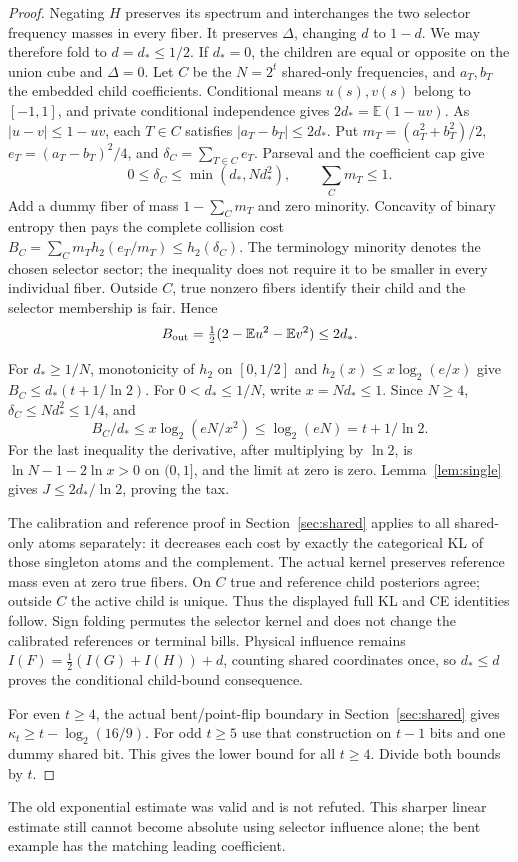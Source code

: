 \documentclass[11pt]{article}
\newcommand{\E}{\mathbb E}
\begin{document}
\begin{proof}
Negating $H$ preserves its spectrum and interchanges the two selector
frequency masses in every fiber. It preserves $\Delta$, changing $d$ to
$1-d$. We may therefore fold to $d=d_*\le1/2$. If $d_*=0$, the children
are equal or opposite on the union cube and $\Delta=0$.
Let $C$ be the $N=2^t$ shared-only frequencies, and $a_T,b_T$ the
embedded child coefficients. Conditional means $u(s),v(s)$ belong to
$[-1,1]$, and private conditional independence gives $2d_*=\E(1-uv)$.
As $|u-v|\le1-uv$, each $T\in C$ satisfies $|a_T-b_T|\le2d_*$.
Put $m_T=(a_T^2+b_T^2)/2$, $e_T=(a_T-b_T)^2/4$, and
$\delta_C=\sum_{T\in C}e_T$. Parseval and the coefficient cap give
\[
 0\le\delta_C\le\min(d_*,N d_*^2),\qquad\sum_C m_T\le1.
\]
Add a dummy fiber of mass $1-\sum_C m_T$ and zero minority. Concavity
of binary entropy then pays the complete collision cost
$B_C=\sum_C m_T h_2(e_T/m_T)\le h_2(\delta_C)$.
The terminology minority denotes the chosen selector sector; the
inequality does not require it to be smaller in every individual fiber.
Outside $C$, true nonzero fibers identify their child and the selector
membership is fair. Hence
\[
 B_{\rm out}=\tfrac12(2-\E u^2-\E v^2)\le2d_*.
\]

For $d_*\ge1/N$, monotonicity of $h_2$ on $[0,1/2]$ and
$h_2(x)\le x\log_2(e/x)$ give
$B_C\le d_*(t+1/\ln2)$.
For $0<d_*\le1/N$, write $x=N d_*\le1$. Since $N\ge4$,
$\delta_C\le N d_*^2\le1/4$, and
\[
 B_C/d_*\le x\log_2(eN/x^2)\le\log_2(eN)=t+1/\ln2.
\]
For the last inequality the derivative, after multiplying by $\ln2$,
is $\ln N-1-2\ln x>0$ on $(0,1]$, and the limit at zero is zero.
Lemma~\ref{lem:single} gives $J\le2d_*/\ln2$, proving the tax.

The calibration and reference proof in Section~\ref{sec:shared} applies
to all shared-only atoms separately: it decreases each cost by exactly
the categorical KL of those singleton atoms and the complement.
The actual kernel preserves reference mass even at zero true fibers.
On $C$ true and reference child posteriors agree; outside $C$ the active
child is unique. Thus the displayed full KL and CE identities follow.
Sign folding permutes the selector kernel and does not change the
calibrated references or terminal bills. Physical influence remains
$I(F)=\tfrac12(I(G)+I(H))+d$, counting shared coordinates once, so
$d_*\le d$ proves the conditional child-bound consequence.

For even $t\ge4$, the actual bent/point-flip boundary in
Section~\ref{sec:shared} gives $\kappa_t\ge t-\log_2(16/9)$.
For odd $t\ge5$ use that construction on $t-1$ bits and one dummy shared
bit. This gives the lower bound for all $t\ge4$. Divide both bounds by $t$.
\end{proof}
The old exponential estimate was valid and is not refuted. This sharper
linear estimate still cannot become absolute using selector influence
alone; the bent example has the matching leading coefficient.
\end{document}

